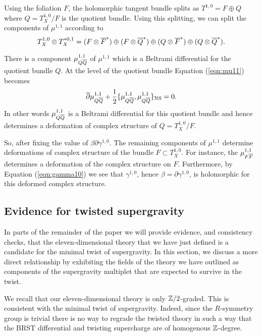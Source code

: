 \documentclass[11pt]{amsart}
\begin{document}
Using the foliation $F$, the holomorphic tangent bundle splits as $T^{1,0} = F \oplus Q$ where $Q = T^{1,0}_X / F$ is the quotient bundle.
Using this splitting, we can split the components of $\mu^{1,1}$ according to
\[
  T^{1,0}_X \otimes T^{*0,1}_X = (F \otimes\Bar{F}^*) \oplus (F \otimes \Bar{Q}^*) \oplus (Q \otimes \Bar{F}^*) \oplus (Q \otimes \Bar{Q}^*) .
\]

There is a component $\mu_{Q\Bar{Q}}^{1,1}$ of $\mu^{1,1}$ which is a Beltrami differential for the quotient bundle $Q$.
At the level of the quotient bundle Equation (\ref{eqn:mu11}) becomes
\[
  \dbar \mu^{1,1}_{Q \Bar{Q}} + \frac12 \{\mu^{1,1}_{Q \Bar{Q}} , \mu^{1,1}_{Q \Bar{Q}}\}_{\rm NS} = 0 .
\]
In other words $\mu^{1,1}_{Q \Bar{Q}}$ is a Beltrami differential for this quotient bundle and hence determines a deformation of complex structure of $Q = T^{1,0}_X / F$.

So, after fixing the value of $\beta \partial \gamma^{1,0}$.
The remaining components of $\mu^{1,1}$ determine deformations of complex structure of the bundle $F \subset T^{1,0}_X$.
For instance, the $\mu^{1,1}_{F \Bar{F}}$ determines a deformation of the complex structure on $F$.
Furthermore, by Equation (\ref{eqn:gamma10}) we see that $\gamma^{1,0}$, hence $\beta = \partial \gamma^{1,0}$, is holomorphic for this deformed complex structure.


\subsection{Evidence for twisted supergravity}


In parts of the remainder of the paper we will provide evidence, and consistency checks, that the eleven-dimensional theory that we have just defined is a candidate for the minimal twist of supergravity.
In this section, we discuss a more direct relationship by exhibiting the fields of the theory we have outlined as components of the supergravity multiplet that are expected to survive in the twist.

We recall that our eleven-dimensional theory is only $\ZZ/2$-graded.
This is consistent with the minimal twist of supergravity.
Indeed, since the $R$-symmetry group is trivial there is no way to regrade the twisted theory in such a way that the BRST differential and twisting supercharge are of homogenous $\ZZ$-degree.
\end{document}
